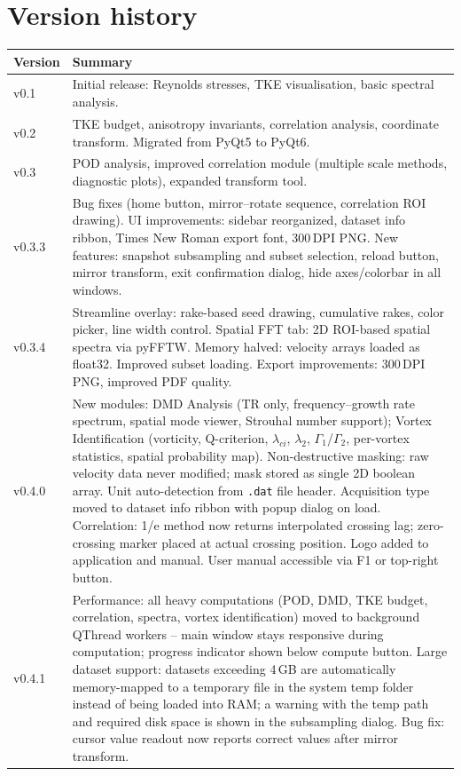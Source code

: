 \documentclass[11pt, a4paper]{report}
\begin{document}
\chapter{Version history}
\begin{table}[htbp]
\centering
\begin{tabular}{lp{12cm}}
\toprule
\textbf{Version} & \textbf{Summary} \\
\midrule
v0.1   & Initial release: Reynolds stresses, TKE visualisation, basic spectral analysis. \\
v0.2   & TKE budget, anisotropy invariants, correlation analysis, coordinate transform. Migrated from PyQt5 to PyQt6. \\
v0.3   & POD analysis, improved correlation module (multiple scale methods, diagnostic plots), expanded transform tool. \\
v0.3.3 & Bug fixes (home button, mirror--rotate sequence, correlation ROI drawing). UI improvements: sidebar reorganized, dataset info ribbon, Times New Roman export font, 300\,DPI PNG. New features: snapshot subsampling and subset selection, reload button, mirror transform, exit confirmation dialog, hide axes/colorbar in all windows. \\
v0.3.4 & Streamline overlay: rake-based seed drawing, cumulative rakes, color picker, line width control. Spatial FFT tab: 2D ROI-based spatial spectra via pyFFTW. Memory halved: velocity arrays loaded as float32. Improved subset loading. Export improvements: 300\,DPI PNG, improved PDF quality. \\
v0.4.0 & New modules: DMD Analysis (TR only, frequency--growth rate spectrum, spatial mode viewer, Strouhal number support); Vortex Identification (vorticity, Q-criterion, $\lambda_{ci}$, $\lambda_2$, $\Gamma_1$/$\Gamma_2$, per-vortex statistics, spatial probability map). Non-destructive masking: raw velocity data never modified; mask stored as single 2D boolean array. Unit auto-detection from \texttt{.dat} file header. Acquisition type moved to dataset info ribbon with popup dialog on load. Correlation: 1/e method now returns interpolated crossing lag; zero-crossing marker placed at actual crossing position. Logo added to application and manual. User manual accessible via F1 or top-right button. \\
v0.4.1 & Performance: all heavy computations (POD, DMD, TKE budget, correlation, spectra, vortex identification) moved to background QThread workers -- main window stays responsive during computation; progress indicator shown below compute button. Large dataset support: datasets exceeding 4\,GB are automatically memory-mapped to a temporary file in the system temp folder instead of being loaded into RAM; a warning with the temp path and required disk space is shown in the subsampling dialog. Bug fix: cursor value readout now reports correct values after mirror transform. \\
\bottomrule
\end{tabular}
\end{table}
\end{document}
